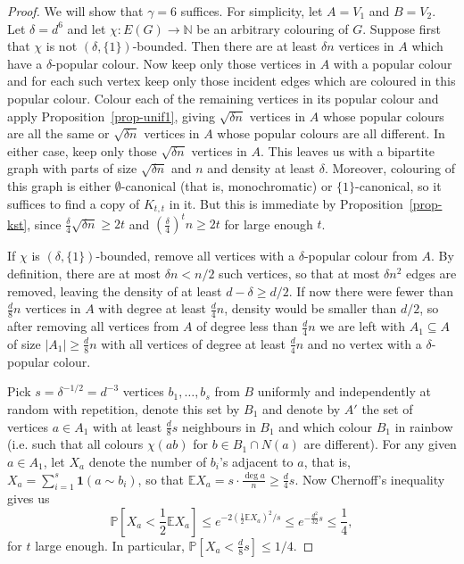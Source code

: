 \documentclass[10pt,a4paper]{article}
\theoremstyle{plain}
\theoremstyle{definition}
\newcommand{\N}{\mathbb{N}}
\newcommand{\bicmpltt}[2]{K_{#1,#2}}
\newcommand{\bicmplt}[1]{\bicmpltt{#1}{#1}}
\newcommand{\expect}{\mathbb{E}}
\newcommand{\prob}{\mathbb{P}}
\newcommand{\one}{\mathbf{1}}
\begin{document}
\begin{proof}
    We will show that $\gamma=6$ suffices. For simplicity, let $A=V_1$ and $B=V_2$. Let $\delta=d^{6}$ and let $\chi:E(G)\to\N$ be an arbitrary colouring of $G$. Suppose first that $\chi$ is not $(\delta,\{1\})$-bounded. Then there are at least $\delta n$ vertices in $A$ which have a $\delta$-popular colour. Now keep only those vertices in $A$ with a popular colour and for each such vertex keep only those incident edges which are coloured in this popular colour. Colour each of the remaining vertices in its popular colour and apply Proposition~\ref{prop-unif1}, giving $\sqrt{\delta n}$ vertices in $A$ whose popular colours are all the same or $\sqrt{\delta n}$ vertices in $A$ whose popular colours are all different. In either case, keep only those $\sqrt{\delta n}$ vertices in $A$. This leaves us with a bipartite graph with parts of size $\sqrt{\delta n}$ and $n$ and density at least $\delta$. Moreover, colouring of this graph is either $\emptyset$-canonical (that is, monochromatic) or $\{1\}$-canonical, so it suffices to find a copy of $\bicmplt{t}$ in it. But this is immediate by Proposition~\ref{prop-kst}, since $\frac{\delta}{4}\sqrt{\delta n}\ge 2t$ and $\left(\frac{\delta}{4}\right)^t n\ge 2t$ for large enough $t$.

    If $\chi$ is $(\delta,\{1\})$-bounded, remove all vertices with a $\delta$-popular colour from $A$. By definition, there are at most $\delta n<n/2$ such vertices, so that at most $\delta n^2$ edges are removed, leaving the density of at least $d-\delta\ge d/2$. If now there were fewer than $\frac{d}{8}n$ vertices in $A$ with degree at least $\frac{d}{4}n$, density would be smaller than $d/2$, so after removing all vertices from $A$ of degree less than $\frac{d}{4}n$ we are left with $A_1\subseteq A$ of size $|A_1|\ge\frac{d}{8}n$ with all vertices of degree at least $\frac{d}{4}n$ and no vertex with a $\delta$-popular colour.

    Pick $s=\delta^{-1/2}=d^{-3}$ vertices $b_1,\dots,b_s$ from $B$ uniformly and independently at random with repetition, denote this set by $B_1$ and denote by $A'$ the set of vertices $a\in A_1$ with at least $\frac{d}{8}s$ neighbours in $B_1$ and which colour $B_1$ in rainbow (i.e. such that all colours $\chi(ab)$ for $b\in B_1\cap N(a)$ are different). For any given $a\in A_1$, let $X_a$ denote the number of $b_i$'s adjacent to $a$, that is, $X_a=\sum_{i=1}^s \one(a\sim b_i)$, so that $\expect X_a=s\cdot\frac{\deg a}{n}\ge\frac{d}{4}s$. Now Chernoff's inequality gives us
    $$\prob\left[X_a<\frac{1}{2}\expect X_a\right]\le e^{-2(\frac{1}{2}\expect X_a)^2/s}\le e^{-\frac{d^2}{32}s}\le\frac{1}{4},$$
    for $t$ large enough. In particular, $\prob[X_a<\frac{d}{8}s]\le1/4$.
    

\end{proof}
\end{document}
